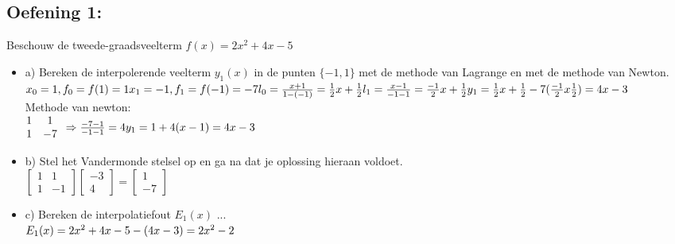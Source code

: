 \documentclass[../Oefenzitting6.tex]{subfiles}
\begin{document}
  \subsection{Oefening 1:}
    Beschouw de tweede-graadsveelterm $f(x) = 2x^{2} + 4x -5$
    \begin{itemize}
      \item a) Bereken de interpolerende veelterm $y_{1}(x)$ in de punten $\{-1, 1 \} $ met de methode van Lagrange en met de methode van Newton.
      \\
      $
        x_{0} = 1, f_{0} = f(1) = 1
        \\
        x_{1} = -1, f_{1} = f(-1) = -7
        \\
        l_{0} = \frac{x+1}{1-(-1)} = \frac{1}{2}x + \frac{1}{2}
        \\
        l_{1} = \frac{x-1}{-1-1} = \frac{-1}{2}x + \frac{1}{2}
        \\
        y_{1} = \frac{1}{2}x + \frac{1}{2} - 7(\frac{-1}{2}x \frac{1}{2})
        \\
        = 4x -3
      $
      \\
      Methode van newton:
      \\
      $
        \begin{matrix}
          1 & 1  \\
          1 & -7
        \end{matrix}
        \\
        \Rightarrow \frac{-7 - 1}{-1 - 1} = 4
        \\
        y_{1} = 1+4(x-1) = 4x - 3
      $

      \item b) Stel het Vandermonde stelsel op en ga na dat je oplossing hieraan voldoet.
      \\
      $
      \begin{bmatrix}
        1 & 1  \\
        1 & -1
      \end{bmatrix}
      \begin{bmatrix}
        -3 \\
        4
      \end{bmatrix}
      =
      \begin{bmatrix}
        1 \\
        -7
      \end{bmatrix}
      $

      \item c) Bereken de interpolatiefout $E_{1}(x)$ ...
      \\
      $
          E_{1}(x) = 2x^{2} + 4x -5 - (4x -3)
          \\
          = 2x^{2} - 2
      $
    \end{itemize}
\end{document}

